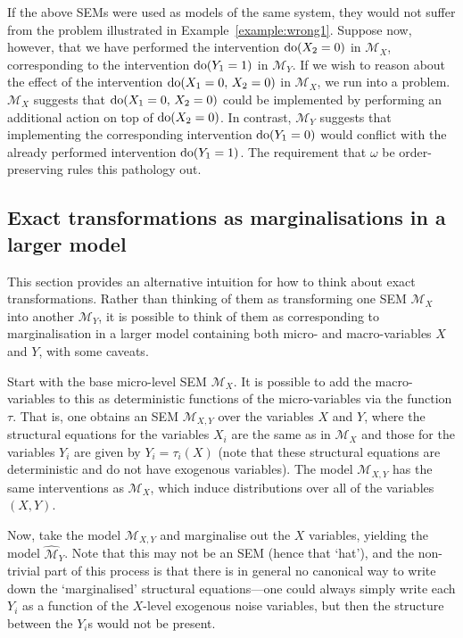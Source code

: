 If the above SEMs were used as models of the same system, they would not suffer from the problem illustrated in Example~\ref{example:wrong1}.
Suppose now, however, that we have performed the intervention $\operatorname{do}(X_2=0)$ in $\mathcal{M}_X$, corresponding to the intervention $\operatorname{do}(Y_1=1)$ in $\mathcal{M}_Y$.
If we wish to reason about the effect of the intervention $\operatorname{do}(X_1=0,\, X_2=0)$ in $\mathcal{M}_X$, we run into a problem.
$\mathcal{M}_X$ suggests that $\operatorname{do}(X_1=0,\, X_2=0)$ could be implemented by performing an additional action on top of $\operatorname{do}(X_2=0)$.
In contrast, $\mathcal{M}_Y$ suggests that implementing the corresponding intervention $\operatorname{do}(Y_1=0)$ would conflict with the already performed intervention $\operatorname{do}(Y_1=1)$.
The requirement that $\omega$ be order-preserving rules this pathology out. 


\subsection{Exact transformations as marginalisations in a larger model}

This section provides an alternative intuition for how to think about exact transformations. 
Rather than thinking of them as transforming one SEM $\mathcal{M}_X$ into another $\mathcal{M}_Y$, it is possible to think of them as corresponding to marginalisation in a larger model containing both micro- and macro-variables $X$ and $Y$, with some caveats. 

Start with the base micro-level SEM $\mathcal{M}_X$. 
It is possible to add the macro-variables to this as deterministic functions of the micro-variables via the function $\tau$. 
That is, one obtains an SEM $\mathcal{M}_{X,Y}$ over the variables $X$ and $Y$, where the structural equations for the variables $X_i$ are the same as in $\mathcal{M}_X$ and those for the variables $Y_i$ are given by $Y_i = \tau_i(X)$ (note that these structural equations are deterministic and do not have exogenous variables).
The model $\mathcal{M}_{X,Y}$ has the same interventions as $\mathcal{M}_{X}$, which induce distributions over all of the variables $(X, Y)$. 

Now, take the model $\mathcal{M}_{X,Y}$ and marginalise out the $X$ variables, yielding the model $\widehat{\mathcal{M}}_Y$. 
Note that this may not be an SEM (hence that `hat'), and the non-trivial part of this process is that there is in general no canonical way to write down the `marginalised' structural equations---one could always simply write each $Y_i$ as a function of the $X$-level exogenous noise variables, but then the structure between the $Y_i$s would not be present.
 
